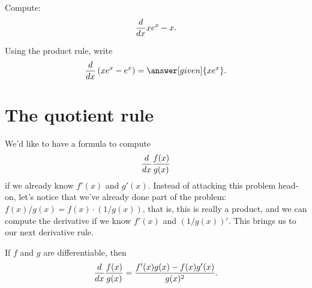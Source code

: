 \documentclass{ximera}
\begin{document}
\begin{example} 
Compute:
\[
\frac{d}{dx} xe^x-x.
\]
\begin{explanation}
Using the product rule, write
\[
\ddx \left(xe^x-e^x \right) =\answer[given]{x e^x}.
\]
\end{explanation}
\end{example}


\section{The quotient rule}


We'd like to have a formula to compute
\[
\frac{d}{dx} \frac{f(x)}{g(x)}
\]
if we already know $f'(x)$ and $g'(x)$. Instead of attacking this
problem head-on, let's notice that we've already done part of the
problem: $f(x)/g(x)= f(x)\cdot(1/g(x))$, that is, this is really a
product, and we can compute the derivative if we know $f'(x)$ and
$(1/g(x))'$. This brings us to our next derivative rule.

\begin{theorem}\label{theorem:quotient-rule}
If $f$ and $g$ are differentiable, then
\[
\frac{d}{dx} \frac{f(x)}{g(x)} = \frac{f'(x)g(x)-f(x)g'(x)}{g(x)^2}.
\]
\end{theorem}
\end{document}
